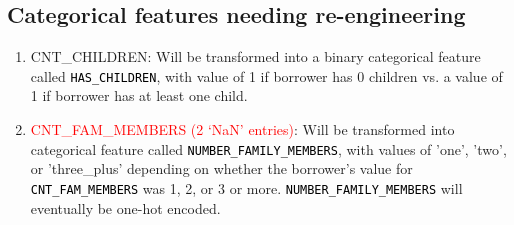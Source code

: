 \documentclass[12pt, letterpaper]{article}
\begin{document}
\begin{appendices}
\subsection{Categorical features needing re-engineering}
\label{catfeatneedreengineering}
\footnotesize
\begin{enumerate}
 \item CNT_CHILDREN: Will be transformed into a binary categorical feature called \colorbox{backcolor}{\textcolor{black}{\texttt{HAS_CHILDREN}}}, with value of 1 if borrower has 0 children vs. a value of 1 if borrower has at least one child.
 \item \textcolor{red}{CNT_FAM_MEMBERS (2 `NaN' entries)}: Will be transformed into categorical feature called \colorbox{backcolor}{\textcolor{black}{\texttt{NUMBER_FAMILY_MEMBERS}}}, with values of 'one', 'two', or 'three_plus' depending on whether the borrower's value for \colorbox{backcolor}{\textcolor{black}{\texttt{CNT_FAM_MEMBERS}}} was 1, 2, or 3 or more. \colorbox{backcolor}{\textcolor{black}{\texttt{NUMBER_FAMILY_MEMBERS}}} will eventually be one-hot encoded.
\end{enumerate}
\normalsize


\end{appendices}
\end{document}
